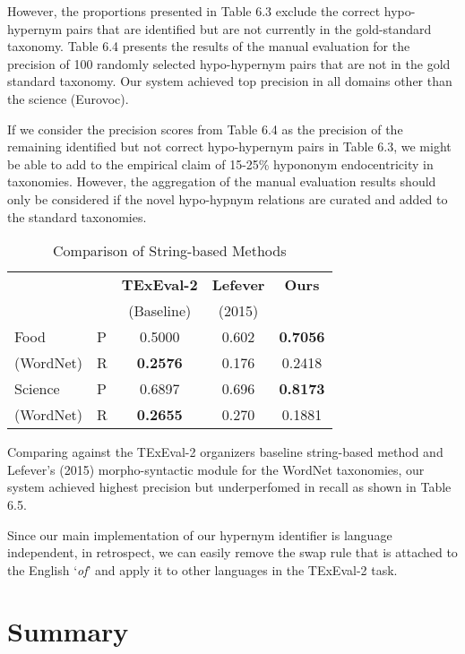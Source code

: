 However, the proportions presented in Table 6.3 exclude the correct hypo-hypernym pairs that are identified but are not currently in the gold-standard taxonomy. Table 6.4 presents the results of the manual evaluation for the precision of 100 randomly selected hypo-hypernym pairs that are not in the gold standard taxonomy. Our system achieved top precision in all domains other than the science (Eurovoc). 

If we consider the precision scores from Table 6.4 as the precision of the remaining identified but not correct hypo-hypernym pairs in Table 6.3, we might be able to add to the empirical claim of 15-25\% hypononym endocentricity in taxonomies. However, the aggregation of the manual evaluation results should only be considered if the novel hypo-hypnym relations are curated and added to the standard taxonomies.

\begin{table}[H]
\centering
    \begin{tabular}{l|l|ccc}
    ~                 & ~ & \textbf{TExEval-2}  & \textbf{Lefever}  & \textbf{Ours}   \\ 
        ~                 & ~ & (Baseline) &  (2015) &    \\ \hline
    Food    & P & 0.5000                & 0.602          & \textbf{0.7056} \\
    (WordNet)                 & R & \textbf{0.2576 }              & 0.176          & 0.2418 \\ \hline
    Science  & P & 0.6897               & 0.696          & \textbf{0.8173} \\
    (WordNet)               & R & \textbf{0.2655}               & 0.270          & 0.1881 \\
    \end{tabular}
\caption{Comparison of String-based Methods}
\end{table}

Comparing against the TExEval-2 organizers baseline string-based method and Lefever's (2015) morpho-syntactic module for the WordNet taxonomies, our system achieved highest precision but underperfomed in recall as shown in Table 6.5. 

Since our main implementation of our hypernym identifier is language independent, in retrospect, we can easily remove the swap rule that is attached to the English `\emph{of}' and apply it to other languages in the TExEval-2 task.

 \section{Summary}
 
